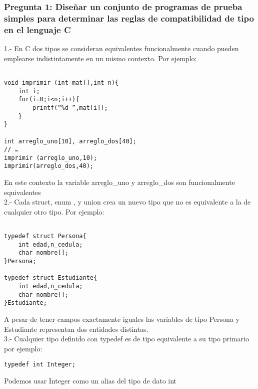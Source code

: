 \subsubsection{Pregunta 1: Diseñar un conjunto de programas de prueba simples para determinar las reglas de compatibilidad de tipo en el lenguaje C}

1.- En C dos tipos se consideran equivalentes funcionalmente cuando pueden emplearse indistintamente en un mismo contexto. Por ejemplo:\\

\lstset{language = C} 
\begin{lstlisting}[frame = single] %Comienzo del Código

void imprimir (int mat[],int n){
	int i;
	for(i=0;i<n;i++){
		printf(“%d ”,mat[i]);
	}
}

int arreglo_uno[10], arreglo_dos[40];
// …
imprimir (arreglo_uno,10);
imprimir(arreglo_dos,40);

\end{lstlisting}
En este contexto la variable arreglo_uno y arreglo_dos son funcionalmente equivalentes\\

2.- Cada struct, enum , y union crea un nuevo tipo que no es equivalente a la de cualquier otro tipo. Por ejemplo:\\

\lstset{language = C} 
\begin{lstlisting}[frame = single] %Comienzo del Código

typedef struct Persona{
    int edad,n_cedula;
    char nombre[];
}Persona;

typedef struct Estudiante{
    int edad,n_cedula;
    char nombre[];
}Estudiante;

\end{lstlisting}

A pesar de tener campos exactamente iguales las variables de tipo Persona y Estudiante representan dos entidades distintas.\\


3.- Cualquier tipo definido con typedef es de tipo equivalente a su tipo primario por ejemplo:\\
\lstset{language = C} 
\begin{lstlisting}[frame = single] %Comienzo del Código
typedef int Integer;
\end{lstlisting}
Podemos usar Integer como un alias del tipo de dato int\\



